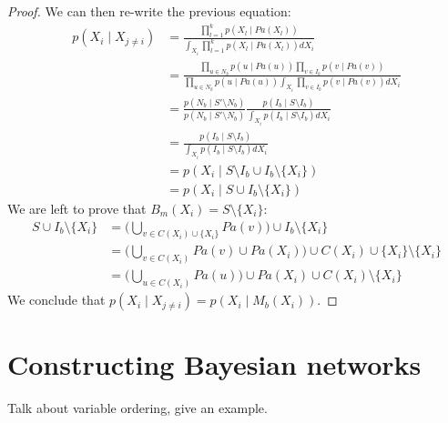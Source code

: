\begin{proof}
\noindent
We can then re-write the previous equation:
\begin{equation}\begin{split}
p(X_i \mid X_{j \neq i}) 
	&= \frac{\prod_{l=1}^{k}p(X_l \mid Pa(X_l))}
		{\int_{X_i} \prod_{l=1}^{k}p(X_l \mid Pa(X_l))dX_i}\\
	&= \frac{\prod_{u \in N_b}p(u \mid Pa(u))
			 \prod_{v \in I_b}p(v \mid Pa(v))}
			{\prod_{u \in N_b}p(u \mid Pa(u))
			 \int_{X_i} \prod_{v \in I_b}p(v \mid Pa(v))dX_i}\\
	&= \frac{p(N_b \mid S' \setminus N_b)}
			{p(N_b \mid S' \setminus N_b)}
	   \frac{p(I_b \mid S \setminus I_b)}
			{\int_{X_i}p(I_b \mid S\setminus I_b)dX_i}\\
	&= \frac{p(I_b \mid S \setminus I_b)}
			{\int_{X_i}p(I_b \mid S \setminus I_b)dX_i}\\
	&= p(X_i \mid S \setminus I_b \cup I_b \setminus \{X_i\})\\
	&= p(X_i \mid S \cup I_b \setminus \{X_i\})
\end{split}\end{equation}
We are left to prove that $B_m(X_i) = S \setminus \{X_i\}$:
\begin{equation}\begin{split}
S \cup I_b \setminus \{X_i\} 
	&= \Bigg(\bigcup_{v \in C(X_i) \cup \{X_i\}} Pa(v) \Bigg) 
		\cup I_b \setminus \{X_i\}\\
	&= \Bigg(\bigcup_{v \in C(X_i)} Pa(v) \cup Pa(X_i) \Bigg) 
		\cup C(X_i) \cup \{X_i\} \setminus \{X_i\}\\
	&= \Bigg(\bigcup_{u \in C(X_i)} Pa(u) \Bigg) \cup Pa(X_i) \cup C(X_i)
		\setminus \{X_i\}
\end{split}\end{equation}
We conclude that $p(X_i \mid X_{j\neq i}) = p(X_i \mid M_b(X_i))$.
\end{proof}

\section{Constructing Bayesian networks}
Talk about variable ordering, give an example.

